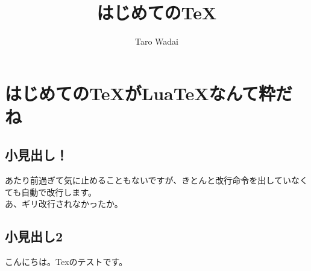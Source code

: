 \documentclass{ltjsarticle}
\begin{document}
\title{はじめての\TeX }
\author{Taro Wadai}
\maketitle
\section{はじめての\TeX がLua\TeX なんて粋だね}

\subsection{小見出し！}
あたり前過ぎて気に止めることもないですが、きとんと改行命令を出していなくても自動で改行します。
\\あ、ギリ改行されなかったか。

\subsection{小見出し2}
こんにちは。Texのテストです。
\end{document}
